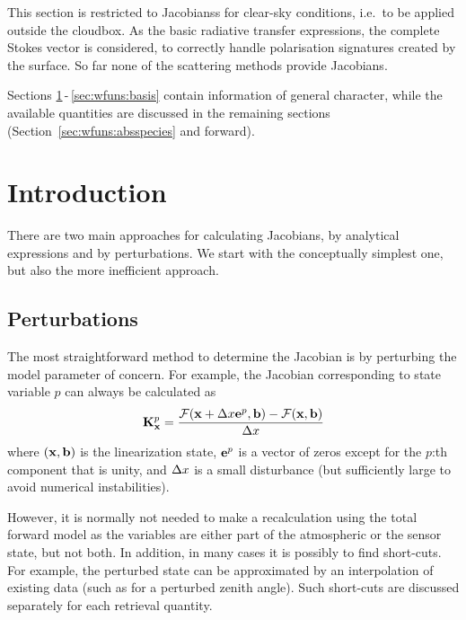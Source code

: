 This section is restricted to Jacobianss for clear-sky conditions, i.e.\ to be
applied outside the cloudbox. As the basic radiative transfer expressions, the
complete Stokes vector is considered, to correctly handle polarisation
signatures created by the surface. So far none of the scattering methods
provide Jacobians.

Sections \ref{sec:wfuns:intro}\,-\,\ref{sec:wfuns:basis} contain information
of general character, while the available quantities are discussed in the
remaining sections (Section~\ref{sec:wfuns:absspecies} and forward).



\section{Introduction}
\label{sec:wfuns:intro}
%
There are two main approaches for calculating Jacobians, by analytical
expressions and by perturbations. We start with the conceptually simplest one,
but also the more inefficient approach.



\subsection{Perturbations}
\label{sec:wfuns:pert}
%
The most straightforward method to determine the Jacobian is by perturbing the
model parameter of concern. For example, the Jacobian corresponding to state
variable $p$ can always be calculated as
\begin{equation}
  \mathbf{K}_{\mathbf{x}}^p = \frac{\mathcal{F}(\mathbf{x}+\Delta x\mathbf{e}^p,
                      \mathbf{b})-\mathcal{F}(\mathbf{x},\mathbf{b})} {\Delta x}
 \label{eq:wfuns:perturb}
\end{equation}
where $(\mathbf{x},\mathbf{b})$ is the linearization state, $\mathbf{e}^p$ is a
vector of zeros except for the $p$:th component that is unity, and
$\Delta x$ is a small disturbance (but sufficiently large to avoid
numerical instabilities).

However, it is normally not needed to make a recalculation using the total
forward model as the variables are either part of the atmospheric or the sensor
state, but not both. In addition, in many cases it is possibly to find
short-cuts. For example, the perturbed state can be approximated by an
interpolation of existing data (such as for a perturbed zenith angle). Such
short-cuts are discussed separately for each retrieval quantity.


